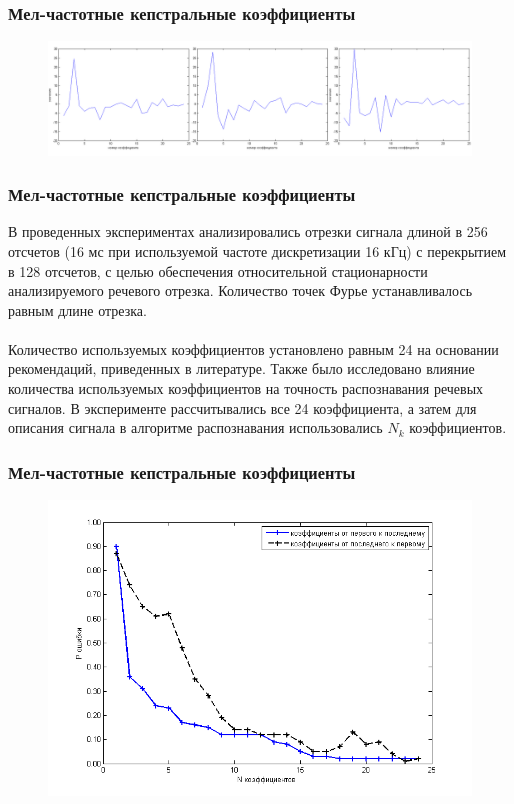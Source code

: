 \documentclass[slidestop, compress, mathserif, blackandwhite, utf8, serif, slidescentered]{beamer}
\begin{document}
 \begin{frame}[plain]
 	\frametitle{Мел-частотные кепстральные коэффициенты}
 	\hfill
	\begin{figure}[h]
	\centering
	\includegraphics[width=\textwidth]{i_mfcc_horz.png}
	\caption{}
	\label{a_mfcc}
	\end{figure}

 \end{frame}

\begin{frame}[plain]
 	\frametitle{Мел-частотные кепстральные коэффициенты}
	В проведенных экспериментах анализировались отрезки сигнала длиной в 256 отсчетов (16 мс при используемой частоте дискретизации 16 кГц) с перекрытием в 128 отсчетов, с целью обеспечения относительной стационарности анализируемого речевого отрезка. Количество точек Фурье устанавливалось равным длине отрезка.\\~\\

	Количество используемых коэффициентов установлено равным 24 на основании рекомендаций, приведенных в литературе. Также было исследовано влияние количества используемых коэффициентов на точность распознавания речевых сигналов. В эксперименте рассчитывались все 24 коэффициента, а затем для описания сигнала в алгоритме распознавания использовались $N_k$ коэффициентов.

\end{frame}

\begin{frame}[plain]
	\frametitle{Мел-частотные кепстральные коэффициенты}
	\begin{figure}[h]
		\centering
		\includegraphics[width=.8\textwidth]{../decrease_legend.png}
		\caption{}
		\label{a_mfcc}
	\end{figure}

\end{frame}
\end{document}
